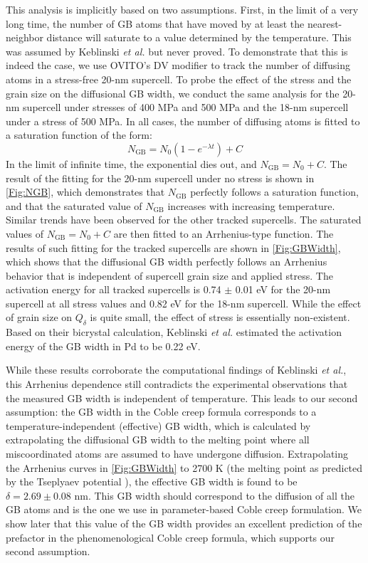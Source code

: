 \documentclass[preprint, 12pt]{elsarticle}
\newcommand{\?}{\stackrel{?}{=}}
\begin{document}
This analysis is implicitly based on two assumptions. First, in the limit of a very long time, the number of GB atoms that have moved by at least the nearest-neighbor distance will saturate to a value determined by the temperature. This was assumed by Keblinski \textit{et al.} \cite{Keblinski1999} but never proved. To demonstrate that this is indeed the case, we use OVITO's DV modifier to track the number of diffusing atoms in a stress-free 20-nm supercell. To probe the effect of the stress and the grain size on the diffusional GB width, we conduct the same analysis for the 20-nm supercell under stresses of 400 MPa and 500 MPa and the 18-nm supercell under a stress of 500 MPa. In all cases, the number of diffusing atoms is fitted to a saturation function of the form:
\begin{equation}
N_\mathrm{GB} = N_0 \left( 1- e^{- \lambda t} \right) + C
\end{equation}
In the limit of infinite time, the exponential dies out, and $N_\mathrm{GB} = N_0 + C$. The result of the fitting for the 20-nm supercell under no stress is shown in \cref{Fig:NGB}, which demonstrates that $N_{\mathrm{GB}}$ perfectly follows a saturation function, and that the saturated value of $N_{\mathrm{GB}}$ increases with increasing temperature. Similar trends have been observed for the other tracked supercells. The saturated values of $N_\mathrm{GB} = N_0 + C$ are then fitted to an Arrhenius-type function. The results of such fitting for the tracked supercells are shown in \cref{Fig:GBWidth}, which shows that the diffusional GB width perfectly follows an Arrhenius behavior that is independent of supercell grain size and applied stress. The activation energy for all tracked supercells is 0.74 $\pm$ 0.01 eV for the 20-nm supercell at all stress values and 0.82 eV for the 18-nm supercell. While the effect of grain size on $Q_\delta$ is quite small, the effect of stress is essentially non-existent. Based on their bicrystal calculation, Keblinski \textit{et al.} \cite{Keblinski1999} estimated the activation energy of the GB width in Pd to be 0.22 eV.

While these results corroborate the computational findings of Keblinski \textit{et al.}, this Arrhenius dependence still contradicts the experimental observations that the measured GB width is independent of temperature. This leads to our second assumption: the GB width in the Coble creep formula corresponds to a temperature-independent (effective) GB width, which is calculated by extrapolating the diffusional GB width to the melting point where all miscoordinated atoms are assumed to have undergone diffusion. Extrapolating the Arrhenius curves in \cref{Fig:GBWidth} to 2700 K (the melting point as predicted by the Tseplyaev potential \cite{AbdulHameed2024}), the effective GB width is found to be $\delta = 2.69 \pm 0.08$ nm. This GB width should correspond to the diffusion of all the GB atoms and is the one we use in parameter-based Coble creep formulation. We show later that this value of the GB width provides an excellent prediction of the prefactor in the phenomenological Coble creep formula, which supports our second assumption.
\end{document}
